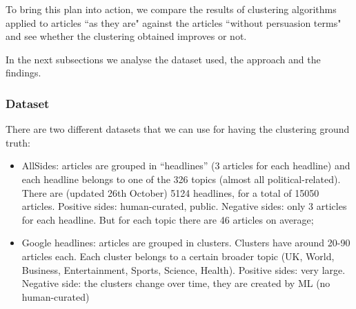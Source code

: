 






To bring this plan into action, we compare the results of  clustering algorithms applied to articles ``as they are" against the articles ``without persuasion terms" and see whether the clustering obtained improves or not.

In the next subsections we analyse the dataset used, the approach and the findings.



\subsubsection{Dataset}

There are two different datasets that we can use for having the clustering ground truth:

\begin{itemize}
    \item AllSides: articles are grouped in “headlines” (3 articles for each headline) and each headline belongs to one of the 326 topics (almost all political-related). There are (updated 26th October) 5124 headlines, for a total of 15050 articles. Positive sides: human-curated, public. Negative sides: only 3 articles for each headline. But for each topic there are 46 articles on average;
    \item Google headlines: articles are grouped in clusters. Clusters have around 20-90 articles each. Each cluster belongs to a certain broader topic (UK, World, Business, Entertainment, Sports, Science, Health). Positive sides: very large. Negative side: the clusters change over time, they are created by ML (no human-curated)
\end{itemize}

